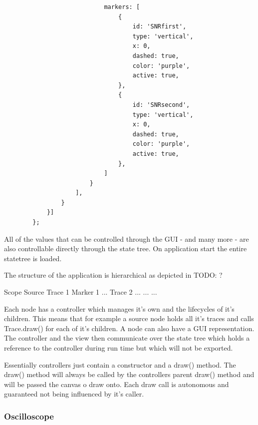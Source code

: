 \begin{tcolorbox}
\begin{verbatim}
                            markers: [
                                {
                                    id: 'SNRfirst',
                                    type: 'vertical',
                                    x: 0,
                                    dashed: true,
                                    color: 'purple',
                                    active: true,
                                },
                                {
                                    id: 'SNRsecond',
                                    type: 'vertical',
                                    x: 0,
                                    dashed: true,
                                    color: 'purple',
                                    active: true,
                                },
                            ]
                        }
                    ],
                }
            }]
        };
    \end{verbatim}
\end{tcolorbox}

All of the values that can be controlled through the GUI - and many more - are also controllable directly through the state tree.
On application start the entire statetree is loaded.

The structure of the application is hierarchical as depicted in TODO: ?

Scope
    Source
        Trace 1
            Marker 1
            ...
        Trace 2
        ...
    ...
...

Each node has a controller which manages it's own and the lifecycles of it's children. This means that for example a source node holds all it's traces and calls Trace.draw() for each of it's children.
A node can also have a GUI representation. The controller and the view then communicate over the state tree which holds a reference to the controller during run time but which will not be exported.

Essentially controllers just contain a constructor and a draw() method. The draw() method will always be called by the controllers parent draw() method and will be passed the canvas o draw onto.
Each draw call is autonomous and guaranteed not being influenced by it's caller.

%
%

\subsubsection*{Oscilloscope}

